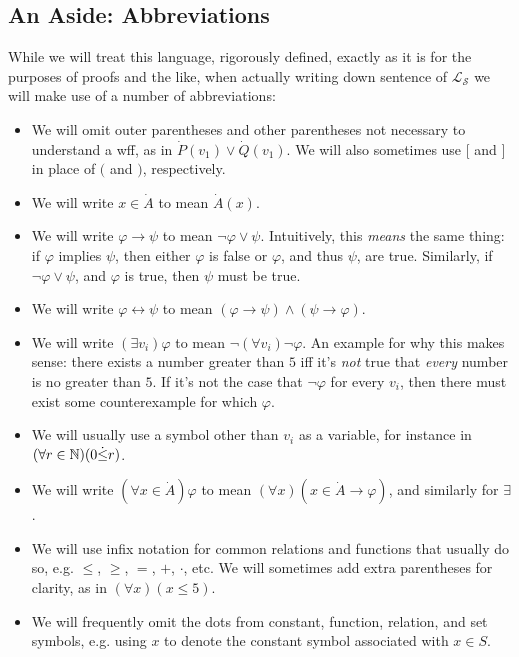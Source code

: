 \subsection{An Aside: Abbreviations}
While we will treat this language, rigorously defined, exactly as it is for the purposes of proofs and the like, when actually writing down sentence of $\mathcal{L}_\mathscr{S}$ we will make use of a number of abbreviations:
\begin{itemize}
    \item We will omit outer parentheses and other parentheses not necessary to understand a wff, as in $\dot P(v_1) \lor \dot Q(v_1)$. We will also sometimes use $[$ and $]$ in place of $($ and $)$, respectively.
    \item We will write $x \in \dot A$ to mean $\dot A(x)$.
    \item We will write $\varphi \to \psi$ to mean $\neg \varphi \lor \psi$. Intuitively, this \textit{means} the same thing: if $\varphi$ implies $\psi$, then either $\varphi$ is false or $\varphi$, and thus $\psi$, are true. Similarly, if $\neg \varphi \lor \psi$, and $\varphi$ is true, then $\psi$ must be true.
    \item We will write $\varphi \leftrightarrow \psi$ to mean $(\varphi \to \psi) \land (\psi \to \varphi)$.
    \item We will write $(\exists v_i) \varphi$ to mean $\neg (\forall v_i) \neg \varphi$. An example for why this makes sense: there exists a number greater than $5$ iff it's \textit{not} true that \textit{every} number is no greater than $5$. If it's not the case that $\neg \varphi$ for every $v_i$, then there must exist some counterexample for which $\varphi$.
    \item We will usually use a symbol other than $v_i$ as a variable, for instance in $(\forall r \in \mathbb{N}) (0 \dot \leq r)$.
    \item We will write $(\forall x \in \dot A)\varphi$ to mean $(\forall x)(x \in \dot A \to \varphi)$, and similarly for $\exists$.
    \item We will use infix notation for common relations and functions that usually do so, e.g. $\leq$, $\geq$, $=$, $+$, $\cdot$, etc. We will sometimes add extra parentheses for clarity, as in $(\forall x)(x \leq 5)$.
    \item We will frequently omit the dots from constant, function, relation, and set symbols, e.g. using $x$ to denote the constant symbol associated with $x \in S$.
\end{itemize}

